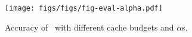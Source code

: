 \begin{figure}[ht]
\vskip -0.1in
\begin{center}
\centerline{\texttt{[image: figs/figs/fig-eval-alpha.pdf]}}
\caption{Accuracy of \algo\ with different cache budgets and $\alpha$s.}
\label{fig-eval-alpha}
\end{center}
\vskip -0.3in
\end{figure}